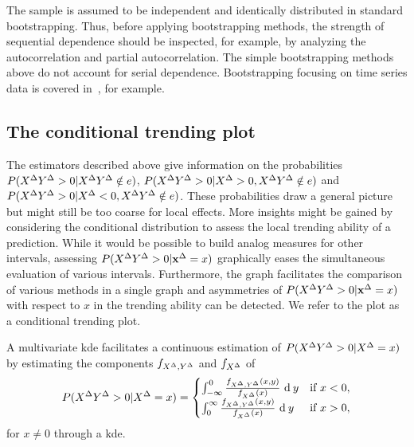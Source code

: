 The sample is assumed to be independent and identically distributed in standard bootstrapping.
Thus, before applying bootstrapping methods, the strength of sequential dependence should be inspected, for example, by analyzing the autocorrelation and partial autocorrelation.
The simple bootstrapping methods above do not account for serial dependence. 
Bootstrapping focusing on time series data is covered in~\textcite{Hardle2003,Kreiss2012}, for example.

\subsection{The conditional trending plot}\label{subsec:trending-cond-prob}


The estimators described above give information on the probabilities $P(X^{\Delta} Y^{\Delta} > 0 | X^{\Delta} Y^{\Delta} \notin e)$, $P(X^{\Delta} Y^{\Delta} > 0 | X^{\Delta} > 0, X^{\Delta} Y^{\Delta} \notin e)$ and $P(X^{\Delta} Y^{\Delta} > 0 | X^{\Delta} < 0, X^{\Delta} Y^{\Delta} \notin e)$.
These probabilities draw a general picture but might still be too coarse for local effects.
More insights might be gained by considering the conditional distribution to assess the local trending ability of a prediction.
While it would be possible to build analog measures for other intervals, assessing $P(X^{\Delta} Y^{\Delta} > 0 | \mathbf{x}^{\Delta} = x)$ graphically eases the simultaneous evaluation of various intervals.
Furthermore, the graph facilitates the comparison of various methods in a single graph and asymmetries of $P(X^{\Delta} Y^{\Delta} > 0 | \mathbf{x}^{\Delta} = x)$ with respect to $x$ in the trending ability can be detected.
We refer to the plot as a conditional trending plot.

A multivariate \acf{kde} facilitates a continuous estimation of $P(X^{\Delta} Y^{\Delta} > 0 | X^{\Delta} = x)$ by estimating the components $f_{X^{\Delta}, Y^{\Delta}}$ and $f_{X^{\Delta}}$ of
\begin{align*}
P(X^{\Delta} Y^{\Delta} > 0 | X^{\Delta} = x) = \begin{cases}
                                              \int_{-\infty}^0 \frac{f_{X^{\Delta}, Y^{\Delta}}(x, y)}{f_{X^{\Delta}}(x)} \ \textrm{d} \: y & \text{if } x < 0, \\
                                              \int_{0}^{\infty} \frac{f_{X^{\Delta}, Y^{\Delta}}(x, y)}{f_{X^{\Delta}}(x)} \ \textrm{d} \: y & \text{if } x > 0, \\
\end{cases}
\end{align*}
for $x \neq 0$ through a \ac{kde}.


